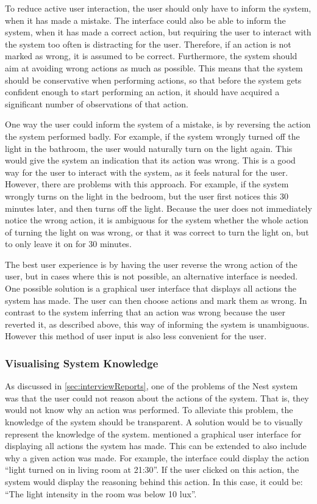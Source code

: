 To reduce active user interaction, the user should only have to inform the system, when it has made a mistake. The interface could also be able to inform the system, when it has made a correct action, but requiring the user to interact with the system too often is distracting for the user. Therefore, if an action is not marked as wrong, it is assumed to be correct. Furthermore, the system should aim at avoiding wrong actions as much as possible. This means that the system should be conservative when performing actions, so that before the system gets confident enough to start performing an action, it should have acquired a significant number of observations of that action.

One way the user could inform the system of a mistake, is by reversing the action the system performed badly. For example, if the system wrongly turned off the light in the bathroom, the user would naturally turn on the light again. This would give the system an indication that its action was wrong. This is a good way for the user to interact with the system, as it feels natural for the user. However, there are problems with this approach. For example, if the system wrongly turns on the light in the bedroom, but the user first notices this 30 minutes later, and then turns off the light. Because the user does not immediately notice the wrong action, it is ambiguous for the system whether the whole action of turning the light on was wrong, or that it was correct to turn the light on, but to only leave it on for 30 minutes.

The best user experience is by having the user reverse the wrong action of the user, but in cases where this is not possible, an alternative interface is needed. One possible solution is a graphical user interface that displays all actions the system has made. The user can then choose actions and mark them as wrong. In contrast to the system inferring that an action was wrong because the user reverted it, as described above, this way of informing the system is unambiguous. However this method of user input is also less convenient for the user.

\subsubsection{Visualising System Knowledge}

As discussed in \cref{sec:interviewReports}, one of the problems of the Nest system was that the user could not reason about the actions of the system. That is, they would not know why an action was performed. To alleviate this problem, the knowledge of the system should be transparent. A solution would be to visually represent the knowledge of the system.  mentioned a graphical user interface for displaying all actions the system has made. This can be extended to also include why a given action was made. For example, the interface could display the action \enquote{light turned on in living room at 21:30}. If the user clicked on this action, the system would display the reasoning behind this action. In this case, it could be: \enquote{The light intensity in the room was below 10 lux}.
